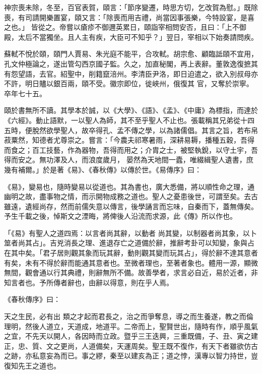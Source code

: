 \begin{pinyinscope}
 神宗喪未除，冬至，百官表賀，頤言：「節序變遷，時思方切，乞改賀為慰。」既除喪，有司請開樂置宴，頤又言：「除喪而用吉禮，尚當因事張樂，今特設宴，是喜之也。」
 皆從之。帝嘗以瘡疹不御邇英累日，頤詣宰相問安否，且曰：「上不御殿，太后不當獨坐。且人主有疾，大臣可不知乎？」翌日，宰相以下始奏請問疾。



 蘇軾不悅於頤，頤門人賈易、朱光庭不能平，合攻軾。胡宗愈、顧臨詆頤不宜用，孔文仲極論之，遂出管勾西京國子監。久之，加直秘閣，再上表辭。董敦逸復摭其有怨望語，去官。紹聖中，削籍竄涪州。李清臣尹洛，即日迫遣之，欲入別叔母亦不許，明日贐以銀百兩，頤不受。徽宗即位，徙峽州，俄復其
 官，又奪於崇寧。卒年七十五。



 頤於書無所不讀。其學本於誠，以《大學》、《語》、《孟》、《中庸》為標指，而達於《六經》。動止語默，一以聖人為師，其不至乎聖人不止也。張載稱其兄弟從十四五時，便脫然欲學聖人，故卒得孔、孟不傳之學，以為諸儒倡。其言之旨，若布帛菽粟然，知德者尤尊崇之。嘗言：「今農夫祁寒暑雨，深耕易耨，播種五穀，吾得而食之；百工技藝，作為器物，吾得而用之；介胄之士，被堅執銳，以守土宇，吾得而安之。無功澤及人，而浪度歲月，
 晏然為天地間一蠹，唯綴緝聖人遺書，庶幾有補爾。」於是著《易》、《春秋傳》以傳於世。《易傳序》曰：



 《易》，變易也，隨時變易以從道也。其為書也，廣大悉備，將以順性命之理，通幽明之故，盡事物之情，而示開物成務之道也。聖人之憂患後世，可謂至矣。去古雖遠，遺經尚存，然而前儒失意以傳言，後學誦言而忘味，自秦而下，蓋無傳矣。予生千載之後，悼斯文之湮晦，將俾後人沿流而求源，此《傳》所以作也。



 「《易》有聖人之道四焉：以言者尚其辭，以動者
 尚其變，以制器者尚其象，以卜筮者尚其占」。吉兇消長之理、進退存亡之道備於辭，推辭考卦可以知變，象與占在其中矣。「君子居則觀其象而玩其辭，動則觀其變而玩其占」，得於辭不達其意者有矣，未有不得於辭而能通其意者也。至微者理也，至著者象也。體用一源，顯微無間，觀會通以行其典禮，則辭無所不備。故善學者，求言必自近，易於近者，非知言者也。予所傳者辭也，由辭以得意，則在乎人焉。



 《春秋傳序》曰：



 天之生民，必有出
 類之才起而君長之，治之而爭奪息，導之而生養遂，教之而倫理明，然後人道立，天道成，地道平。二帝而上，聖賢世出，隨時有作，順乎風氣之宜，不先天以開人，各因時而立政。暨乎三王迭興，三重既備，子、丑、寅之建正，忠、質、文之更尚，人道備矣，天運周矣。聖王既不復作，有天下者雖欲仿古之跡，亦私意妄為而已。事之繆，秦至以建亥為正；道之悖，漢專以智力持世，豈復知先王之道也。




\end{pinyinscope}

